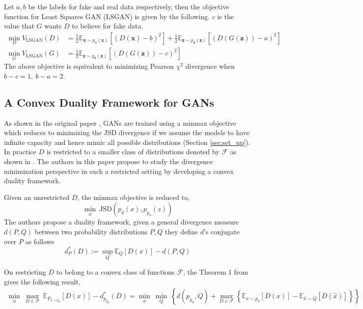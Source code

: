 Let $a,b$ be the labels for fake and real data respectively, then the objective function for Least Squares GAN (LSGAN) is given by the following. $c$ is the value that $G$ wants $D$ to believe for fake data.
\begin{equation}
    \label{eq:lsgan}
    \begin{aligned} \min _{D} V_{\mathrm{LSGAN}}(D) &=\frac{1}{2} \mathbb{E}_{\boldsymbol{x} \sim p_{\mathrm{d}}(\boldsymbol{x})}\left[(D(\boldsymbol{x})-b)^{2}\right]+  \frac{1}{2} \mathbb{E}_{\boldsymbol{z} \sim p_{\boldsymbol{z}}(\boldsymbol{z})}\left[(D(G(\boldsymbol{z}))-a)^{2}\right] \\ \min _{G} V_{\mathrm{LSGAN}}(G) &=\frac{1}{2} \mathbb{E}_{\boldsymbol{z} \sim p_{\boldsymbol{z}}(\boldsymbol{z})}\left[(D(G(\boldsymbol{z}))-c)^{2}\right] \end{aligned}
\end{equation}
The above objective is equivalent to minimizing Pearson $\chi^2$ divergence when $b-c=1,\ b-a=2$. \\


\subsection*{A Convex Duality Framework for GANs \citep{convDual}}
As shown in the original paper \cite{ganGoodfellow}, GANs are trained using a minmax objective which reduces to minimizing the JSD divergence if we assume the models to have infinite capacity and hence mimic all possible distributions (Section \ref{sec:set_up}). In practice $D$ is restricted to a smaller class of distributions denoted by $\mathcal{F}$ as shown in \citep{Arora03}. The authors in this paper propose to study the divergence minimization perspective in such a restricted setting by developing a convex duality framework.



Given an unrestricted $D$, the minmax objective is reduced to,
$$
\min _{\phi} \ \mathrm{JSD}\left(p_d(x), p_{g_{\phi}}(z)\right)
$$
The authors propose a duality framework, given a general divergence measure $d(P,Q)$ between two probability distributions $P, Q$ they define $d$'s
 conjugate over $P$ as follows
$$
d_{P}^{*}(D) :=\sup _{Q} \mathbb{E}_{Q}[D(x)]-d(P, Q)
$$

On restricting $D$ to belong to a convex class of functions $\mathcal{F}$, the Theorem 1 from \cite{} gives the following result,
$$
\begin{aligned}  \min _{\phi} \  \max _{D \in \mathcal{F}} \  \mathbb{E}_{P_{x\sim p_d}}[D(x)]-d_{p_{g_{\phi}}}^{*}(D) = \min _{\phi} \ \min _{Q}\ \left\{d\left(p_{g_{\phi}}, Q\right)+\max _{D \in \mathcal{F}}\left\{\mathbb{E}_{x\sim p_d}[D(x)]-\mathbb{E}_{\hat{x}\sim Q}[D(\hat{x})]\right\}\right\} \end{aligned}
$$

